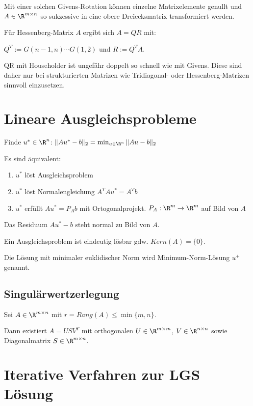 Mit einer solchen Givens-Rotation können einzelne Matrixelemente genullt und $A \in \R^{m \times n}$ so sukzessive in eine obere Dreiecksmatrix transformiert werden.

Für Hessenberg-Matrix $A$ ergibt sich $A=QR$ mit:

$Q^T := G(n-1,n) \cdots G(1,2)$ und $R:=Q^T A$.

\spacing

QR mit Householder ist ungefähr doppelt so schnell wie mit Givens. Diese sind daher nur bei strukturierten Matrizen wie Tridiagonal- oder Hessenberg-Matrizen sinnvoll einzusetzen.

\section*{Lineare Ausgleichsprobleme}

Finde $u^* \in \R^n$: $\|Au^*-b\|_2 = \min_{u\in \R^n} \|Au-b\|_2$

Es sind äquivalent:

\begin{enumerate}[label=(\alph*)]
	\item $u^*$ löst Ausgleichsproblem
	\item $u^*$ löst Normalengleichung $A^TAu^*=A^Tb$
	\item $u^*$ erfüllt $Au^* = P_Ab$ mit Ortogonalprojekt. $P_A : \R^m \rightarrow \R^m$ auf Bild von $A$
\end{enumerate}

Das Residuum $Au^*-b$ steht normal zu Bild von $A$.

Ein Ausgleichsproblem ist eindeutig lösbar gdw. $Kern(A) = \{0\}$.

Die Lösung mit minimaler euklidischer Norm wird Minimum-Norm-Lösung $u^+$ genannt.

\subsection*{Singulärwertzerlegung}

Sei $A \in \R^{m \times n}$ mit $r=Rang(A) \leq \min\{m,n\}$.

Dann existiert $A=USV^T$ mit orthogonalen $U \in \R^{m \times m}$, $V \in \R^{n \times n}$ sowie Diagonalmatrix $S \in \R^{m \times n}$.

\section*{Iterative Verfahren zur LGS Lösung}

